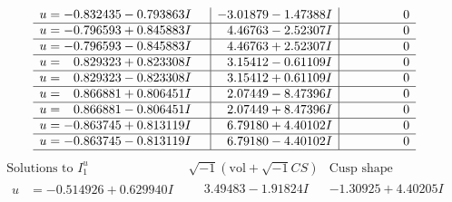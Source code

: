\documentclass[1p]{elsarticle_modified}
\theoremstyle{definition}
\newcommand{\I}{\sqrt{-1}}
\begin{document}
$$\begin{array}{c|c|c}
\begin{aligned}
u &= -0.832435 - 0.793863 I\end{aligned}
 & -3.01879 - 1.47388 I & \phantom{-0.000000 } 0 \\ \hline\begin{aligned}
u &= -0.796593 + 0.845883 I\end{aligned}
 & \phantom{-}4.46763 - 2.52307 I & \phantom{-0.000000 } 0 \\ \hline\begin{aligned}
u &= -0.796593 - 0.845883 I\end{aligned}
 & \phantom{-}4.46763 + 2.52307 I & \phantom{-0.000000 } 0 \\ \hline\begin{aligned}
u &= \phantom{-}0.829323 + 0.823308 I\end{aligned}
 & \phantom{-}3.15412 - 0.61109 I & \phantom{-0.000000 } 0 \\ \hline\begin{aligned}
u &= \phantom{-}0.829323 - 0.823308 I\end{aligned}
 & \phantom{-}3.15412 + 0.61109 I & \phantom{-0.000000 } 0 \\ \hline\begin{aligned}
u &= \phantom{-}0.866881 + 0.806451 I\end{aligned}
 & \phantom{-}2.07449 - 8.47396 I & \phantom{-0.000000 } 0 \\ \hline\begin{aligned}
u &= \phantom{-}0.866881 - 0.806451 I\end{aligned}
 & \phantom{-}2.07449 + 8.47396 I & \phantom{-0.000000 } 0 \\ \hline\begin{aligned}
u &= -0.863745 + 0.813119 I\end{aligned}
 & \phantom{-}6.79180 + 4.40102 I & \phantom{-0.000000 } 0 \\ \hline\begin{aligned}
u &= -0.863745 - 0.813119 I\end{aligned}
 & \phantom{-}6.79180 - 4.40102 I & \phantom{-0.000000 } 0\\
 \hline 
 \end{array}$$\newpage$$\begin{array}{c|c|c}  
\text{Solutions to }I^u_{1}& \I (\text{vol} + \sqrt{-1}CS) & \text{Cusp shape}\\
 \hline 
\begin{aligned}
u &= -0.514926 + 0.629940 I\end{aligned}
 & \phantom{-}3.49483 - 1.91824 I & -1.30925 + 4.40205 I \\ \hline\begin{aligned}

\end{aligned}
\end{array}$$
\end{document}

